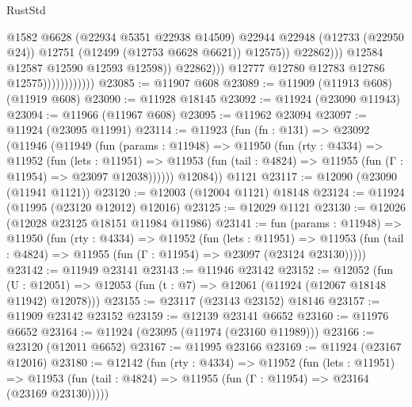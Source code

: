 \begin{lexlean}{RustStd}
\begin{coremodule}
{\begin{coremodule}
{{{{{{{{{{{{{{{{{{{{{{{{{{{{{{{{{{{{{{{{{{{{{{{{{{{{{{{{{{{{{{{{{{{{{{{{{{{{{{{{                                                @1582
                                                @6628
                                                (@22934 @5351 @22938 @14509)
                                                @22944
                                                @22948
                                                (@12733 (@22950 @24))
                                                @12751
                                                (@12499 (@12753 @6628 @6621))
                                                @12575))
                                            @22862)))
                                      @12584
                                      @12587
                                      @12590
                                      @12593
                                      @12598))
                                  @22862)))
                            @12777
                            @12780
                            @12783
                            @12786
                            @12575))))))))))))
@23085 := @11907 @608
@23089 := @11909 (@11913 @608) (@11919 @608)
@23090 := @11928 @18145
@23092 := @11924 (@23090 @11943)
@23094 := @11966 (@11967 @608)
@23095 := @11962 @23094
@23097 := @11924 (@23095 @11991)
@23114 := @11923
    (fun (fn : @131) =>
    @23092
      (@11946
        (@11949
          (fun (params : @11948) =>
          @11950
            (fun (rty : @4334) =>
            @11952
              (fun (lets : @11951) =>
              @11953 (fun (tail : @4824) => @11955 (fun (Γ : @11954) => @23097 @12038))))))
        @12084))
    @1121
@23117 := @12090 (@23090 (@11941 @1121))
@23120 := @12003 (@12004 @1121) @18148
@23124 := @11924 (@11995 (@23120 @12012) @12016)
@23125 := @12029 @1121
@23130 := @12026 (@12028 @23125 @18151 @11984 @11986)
@23141 := fun (params : @11948) =>
  @11950
    (fun (rty : @4334) =>
    @11952
      (fun (lets : @11951) =>
      @11953 (fun (tail : @4824) => @11955 (fun (Γ : @11954) => @23097 (@23124 @23130)))))
@23142 := @11949 @23141
@23143 := @11946 @23142
@23152 := @12052
    (fun (U : @12051) => @12053 (fun (t : @7) => @12061 (@11924 (@12067 @18148 @11942) @12078)))
@23155 := @23117 (@23143 @23152) @18146
@23157 := @11909 @23142 @23152
@23159 := @12139 @23141 @6652
@23160 := @11976 @6652
@23164 := @11924 (@23095 (@11974 (@23160 @11989)))
@23166 := @23120 (@12011 @6652)
@23167 := @11995 @23166
@23169 := @11924 (@23167 @12016)
@23180 := @12142
    (fun (rty : @4334) =>
    @11952
      (fun (lets : @11951) =>
      @11953 (fun (tail : @4824) => @11955 (fun (Γ : @11954) => @23164 (@23169 @23130)))))
}}}}}}}}}}}}}}}}}}}}}}}}}}}}}}}}}}}}}}}}}}}}}}}}}}}}}}}}}}}}}}}}}}}}}}}}}}}}}}}}
\end{coremodule}}
\end{coremodule}
\end{lexlean}
